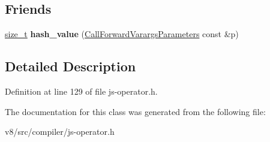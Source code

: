 \subsection*{Friends}
\begin{DoxyCompactItemize}
\item 
\mbox{\label{classv8_1_1internal_1_1compiler_1_1CallForwardVarargsParameters_a8e61855196168972e4f281ec44d03852}} 
\mbox{\hyperlink{classsize__t}{size\+\_\+t}} {\bfseries hash\+\_\+value} (\mbox{\hyperlink{classv8_1_1internal_1_1compiler_1_1CallForwardVarargsParameters}{Call\+Forward\+Varargs\+Parameters}} const \&p)
\end{DoxyCompactItemize}


\subsection{Detailed Description}


Definition at line 129 of file js-\/operator.\+h.



The documentation for this class was generated from the following file\+:\begin{DoxyCompactItemize}
\item 
v8/src/compiler/js-\/operator.\+h\end{DoxyCompactItemize}
